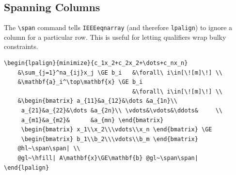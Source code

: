 \documentclass{article}
\begin{document}
\subsection*{Spanning Columns}
The \verb|\span| command tells \verb|IEEEeqnarray| (and therefore \verb|lpalign|) to ignore a column for a particular row. This is useful for letting qualifiers wrap bulky constraints.
\begin{tcolorbox}
	\begin{Verbatim}
\begin{lpalign}{minimize}{c_1x_2+c_2x_2+\dots+c_nx_n}
	&\sum_{j=1}^na_{ij}x_j \GE b_i   &\forall\ i\in[\![m]\!] \\
	&\mathbf{a}_i^\top\mathbf{x} \GE b_i  
	                                 &\forall\ i\in[\![m]\!] \\
	&\begin{bmatrix} a_{11}&a_{12}&\dots &a_{1n}\\
	 a_{21}&a_{22}&\dots &a_{2n}\\ \vdots&\vdots&\ddots&     \\
	 a_{m1}&a_{m2}&      &a_{mn} \end{bmatrix}
	 \begin{bmatrix} x_1\\x_2\\\vdots\\x_n \end{bmatrix} \GE
	 \begin{bmatrix} b_1\\b_2\\\vdots\\b_m \end{bmatrix}
	@hl~\span\span| \\
	@gl~\hfill| A\mathbf{x}\GE\mathbf{b} @gl~\span\span|
\end{lpalign}


\end{Verbatim}
\end{tcolorbox}
\end{document}
